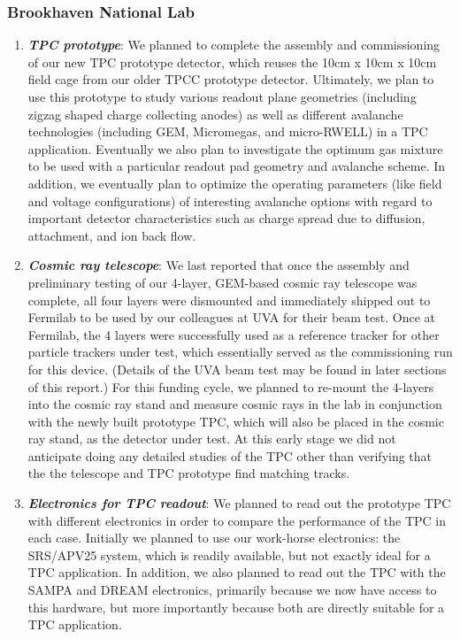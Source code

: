 \subsubsection{Brookhaven National Lab}

\begin{enumerate}

\item	\textbf{\emph{TPC prototype}}: We planned to complete the assembly and commissioning of our new TPC prototype detector, which reuses the 10cm x 10cm x 10cm field cage from our older TPCC prototype detector. Ultimately, we plan to use this prototype to study various readout plane geometries (including zigzag shaped charge collecting anodes) as well as different avalanche technologies (including GEM, Micromegas, and micro-RWELL) in a TPC application. Eventually we also plan to investigate the optimum gas mixture to be used with a particular readout pad geometry and avalanche scheme. In addition, we eventually plan to optimize the operating parameters (like field and voltage configurations) of interesting avalanche options with regard to important detector characteristics such as charge spread due to diffusion, attachment, and ion back flow.   

\item \textbf{\emph{Cosmic ray telescope}}: We last reported that once the assembly and preliminary testing of our 4-layer, GEM-based cosmic ray telescope was complete, all four layers were dismounted and immediately shipped out to Fermilab to be used by our colleagues at UVA for their beam test. Once at Fermilab, the 4 layers were successfully used as a reference tracker for other particle trackers under test, which essentially served as the commissioning run for this device. (Details of the UVA beam test may be found in later sections of this report.) For this funding cycle, we planned to re-mount the 4-layers into the cosmic ray stand and measure cosmic rays in the lab in conjunction with the newly built prototype TPC, which will also be placed in the cosmic ray stand, as the detector under test. At this early stage we did not anticipate doing any detailed studies of the TPC other than verifying that the the telescope and TPC prototype find matching tracks. 

\item	\textbf{\emph{Electronics for TPC readout}}: We planned to read out the prototype TPC with different electronics in order to compare the performance of the TPC in each case. Initially we planned to use our work-horse electronics: the SRS/APV25 system, which is readily available, but not exactly ideal for a TPC application. In addition, we also planned to read out the TPC with the SAMPA and DREAM electronics, primarily because we now have access to this hardware, but more importantly because both are directly suitable for a TPC application.  


\end{enumerate}
